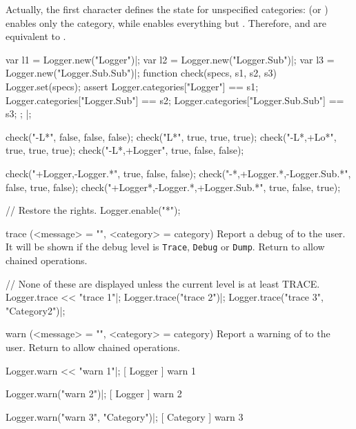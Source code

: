 \begin{urbiscriptapi}
  Actually, the first character defines the state for unspecified
  categories:  (or ) enables only the 
  category, while  enables everything but .
  Therefore,  and  are
  equivalent to .

\begin{urbiscript}
var l1 = Logger.new("Logger")|;
var l2 = Logger.new("Logger.Sub")|;
var l3 = Logger.new("Logger.Sub.Sub")|;
function check(specs, s1, s2, s3)
{
  Logger.set(specs);
  assert
  {
    Logger.categories["Logger"]         == s1;
    Logger.categories["Logger.Sub"]     == s2;
    Logger.categories["Logger.Sub.Sub"] == s3;
  };
}|;

check("-L*",      false, false, false);
check("L*",       true, true, true);
check("-L*,+Lo*", true, true, true);
check("-L*,+Logger", true, false, false);

check("+Logger,-Logger.*", true, false, false);
check("-*,+Logger.*,-Logger.Sub.*", false, true, false);
check("+Logger*,-Logger.*,+Logger.Sub.*", true, false, true);
\end{urbiscript}

\begin{urbicomment}
// Restore the rights.
Logger.enable("*");
\end{urbicomment}


\item[trace](<message> = "", <category> = category)%
  Report a debug  of  to the user. It will be
  shown if the debug level is \lstinline|Trace|, \lstinline|Debug| or
  \lstinline|Dump|. Return \this to allow chained operations.
\begin{urbiscript}
// None of these are displayed unless the current level is at least TRACE.
Logger.trace << "trace 1"|;
Logger.trace("trace 2")|;
Logger.trace("trace 3", "Category2")|;
\end{urbiscript}


\item[warn](<message> = "", <category> = category)%
  Report a warning  of  to the user. Return \this
  to allow chained operations.
\begin{urbiscript}
Logger.warn << "warn 1"|;
[       Logger        ] warn 1

Logger.warn("warn 2")|;
[       Logger        ] warn 2

Logger.warn("warn 3", "Category")|;
[       Category       ] warn 3
\end{urbiscript}
\end{urbiscriptapi}

